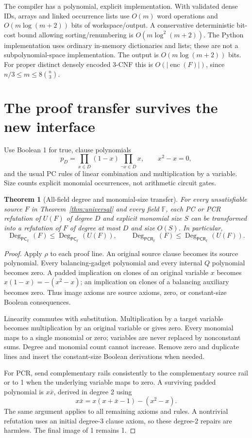 \documentclass[11pt]{article}
\newtheorem{theorem}{Theorem}
\newcommand{\PC}{\mathsf{PC}}
\newcommand{\PCR}{\mathsf{PCR}}
\newcommand{\Deg}{\operatorname{Deg}}
\begin{document}
The compiler has a polynomial, explicit implementation. With validated dense
IDs, arrays and linked occurrence lists use $O(m)$ word operations and
$O(m\log(m+2))$ bits of workspace/output. A conservative deterministic
bit-cost bound allowing sorting/renumbering is $O(m\log^2(m+2))$.
The Python implementation uses ordinary in-memory dictionaries and lists;
these are not a subpolynomial-space implementation. The output is
$O(m\log(m+2))$ bits. For proper distinct densely encoded 3-CNF this is
$O(|\operatorname{enc}(F)|)$, since $n/3\le m\le8\binom n3$.

\section{The proof transfer survives the new interface}
Use Boolean 1 for true, clause polynomials
\[
p_D=\prod_{x\in D}(1-x)\prod_{\neg x\in D}x,
\qquad x^2-x=0,
\]
and the usual PC rules of linear combination and multiplication by a
variable. Size counts explicit monomial occurrences, not arithmetic circuit gates.

\begin{theorem}[All-field degree and monomial-size transfer]\label{thm:PC}
For every unsatisfiable source $F$ in Theorem~\ref{thm:universal} and every field
$\mathbb F$, each PC or PCR refutation of $U(F)$ of degree $D$ and explicit
monomial size $S$ can be transformed into a refutation of $F$ of degree at most
$D$ and size $O(S)$. In particular,
\[
\Deg_{\PC_{\mathbb F}}(F)\le\Deg_{\PC_{\mathbb F}}(U(F)),\qquad
\Deg_{\PCR_{\mathbb F}}(F)\le\Deg_{\PCR_{\mathbb F}}(U(F)).
\]
\end{theorem}
\begin{proof}
Apply $\rho$ to each proof line. An original source clause becomes its source
polynomial. Every balancing-gadget polynomial and every internal $Q$
polynomial becomes zero. A padded implication on clones of an original
variable $x$ becomes $x(1-x)=-(x^2-x)$; an implication on clones of a
balancing auxiliary becomes zero. Thus image axioms are source axioms,
zero, or constant-size Boolean consequences.

Linearity commutes with substitution. Multiplication by a target variable
becomes multiplication by an original variable or gives zero. Every monomial
maps to a single monomial or zero; variables are never replaced by nonconstant
sums. Degree and monomial count cannot increase. Remove zero and duplicate
lines and insert the constant-size Boolean derivations when needed.

For PCR, send complementary rails consistently to the complementary source
rail or to 1 when the underlying variable maps to zero. A surviving padded
polynomial is $x\bar x$, derived in degree 2 using
\[
x\bar x=x(x+\bar x-1)-(x^2-x).
\]
The same argument applies to all remaining axioms and rules. A nontrivial
refutation uses an initial degree-3 clause axiom, so these degree-2 repairs
are harmless. The final image of 1 remains 1.
\end{proof}
\end{document}
